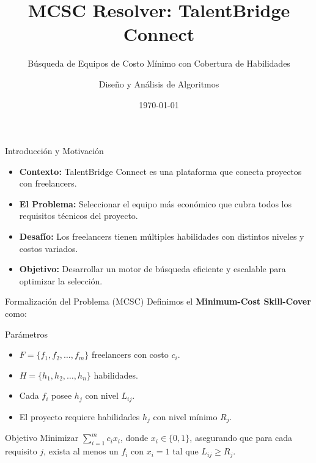 \documentclass[10pt]{beamer}
\title[MCSC Solver]{MCSC Resolver: TalentBridge Connect}
\subtitle{Búsqueda de Equipos de Costo Mínimo con Cobertura de Habilidades}
\author[DAA 2026]{Diseño y Análisis de Algoritmos}
\institute[DAA]{Facultad de Ingeniería}
\date{\today}
\begin{document}
\begin{frame}
    \titlepage
\end{frame}

\begin{frame}{Introducción y Motivación}
    \begin{itemize}
        \item \textbf{Contexto:} TalentBridge Connect es una plataforma que conecta proyectos con freelancers.
        \item \textbf{El Problema:} Seleccionar el equipo más económico que cubra todos los requisitos técnicos del proyecto.
        \item \textbf{Desafío:} Los freelancers tienen múltiples habilidades con distintos niveles y costos variados.
        \item \textbf{Objetivo:} Desarrollar un motor de búsqueda eficiente y escalable para optimizar la selección.
    \end{itemize}
\end{frame}

\begin{frame}{Formalización del Problema (MCSC)}
    Definimos el \textbf{Minimum-Cost Skill-Cover} como:
    \vspace{0.5cm}
    \begin{block}{Parámetros}
        \begin{itemize}
            \item $F = \{f_1, f_2, \dots, f_m\}$ freelancers con costo $c_i$.
            \item $H = \{h_1, h_2, \dots, h_n\}$ habilidades.
            \item Cada $f_i$ posee $h_j$ con nivel $L_{ij}$.
            \item El proyecto requiere habilidades $h_j$ con nivel mínimo $R_j$.
        \end{itemize}
    \end{block}
    \begin{block}{Objetivo}
        Minimizar $\sum_{i=1}^{m} c_i x_i$, donde $x_i \in \{0, 1\}$, asegurando que para cada requisito $j$, exista al menos un $f_i$ con $x_i=1$ tal que $L_{ij} \ge R_j$.
    \end{block}
\end{frame}
\end{document}
